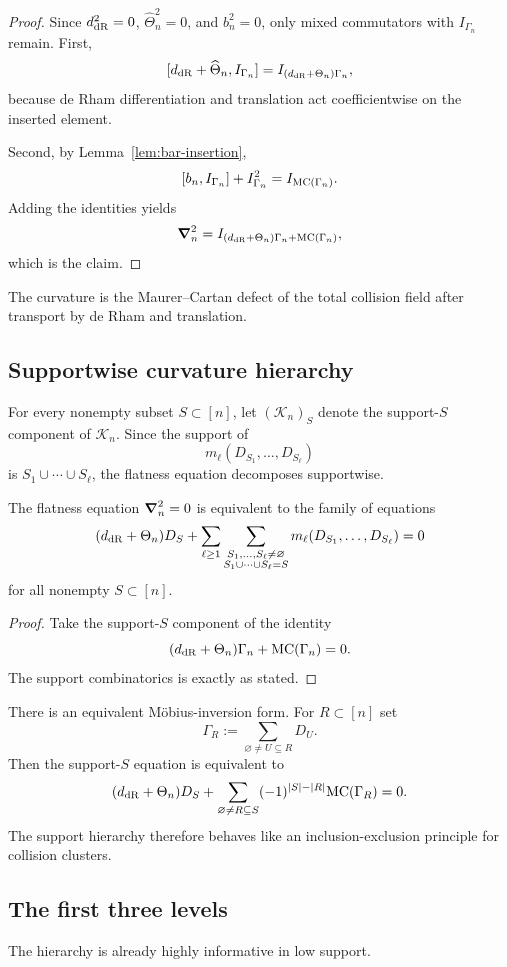 \begin{proof}
Since $d_{\mathrm{dR}}^2=0$, $\widehat\Theta_n^2=0$, and $b_n^2=0$, only mixed commutators with $I_{\Gamma_n}$ remain. First,
\[
 [d_{\mathrm{dR}}+\widehat\Theta_n,I_{\Gamma_n}] = I_{(d_{\mathrm{dR}}+\Theta_n)\Gamma_n},
\]
because de Rham differentiation and translation act coefficientwise on the inserted element.

Second, by Lemma~\ref{lem:bar-insertion},
\[
 [b_n,I_{\Gamma_n}] + I_{\Gamma_n}^2 = I_{\mathrm{MC}(\Gamma_n)}.
\]
Adding the identities yields
\[
 \boldsymbol{\nabla}_n^2 = I_{(d_{\mathrm{dR}}+\Theta_n)\Gamma_n+\mathrm{MC}(\Gamma_n)},
\]
which is the claim.
\end{proof}

The curvature is the Maurer--Cartan defect of the total collision field after transport by de Rham and translation.

\subsection{Supportwise curvature hierarchy}
For every nonempty subset $S\subset[n]$, let $(\mathcal K_n)_S$ denote the support-$S$ component of $\mathcal K_n$. Since the support of
\[
 m_\ell(D_{S_1},\dots,D_{S_\ell})
\]
is $S_1\cup\cdots\cup S_\ell$, the flatness equation decomposes supportwise.

\begin{theorem}%
The flatness equation $\boldsymbol{\nabla}_n^2=0$ is equivalent to the family of equations
\[
 (d_{\mathrm{dR}}+\Theta_n)D_S +
 \sum_{\ell\ge 1}
 \sum_{\substack{S_1,\dots,S_\ell\neq\varnothing \\
 S_1\cup\cdots\cup S_\ell = S}}
 m_\ell(D_{S_1},\dots,D_{S_\ell})
 =0
\]
for all nonempty $S\subset[n]$.
\end{theorem}

\begin{proof}
Take the support-$S$ component of the identity
\[
 (d_{\mathrm{dR}}+\Theta_n)\Gamma_n+\mathrm{MC}(\Gamma_n)=0.
\]
The support combinatorics is exactly as stated.
\end{proof}

There is an equivalent Möbius-inversion form. For $R\subset[n]$ set
\[
 \Gamma_R:=\sum_{\varnothing\neq U\subseteq R}D_U.
\]
Then the support-$S$ equation is equivalent to
\[
 (d_{\mathrm{dR}}+\Theta_n)D_S + \sum_{\varnothing\neq R\subseteq S}(-1)^{|S|-|R|}\mathrm{MC}(\Gamma_R)=0.
\]
The support hierarchy therefore behaves like an inclusion-exclusion principle for collision clusters.

\subsection{The first three levels}
The hierarchy is already highly informative in low support.

